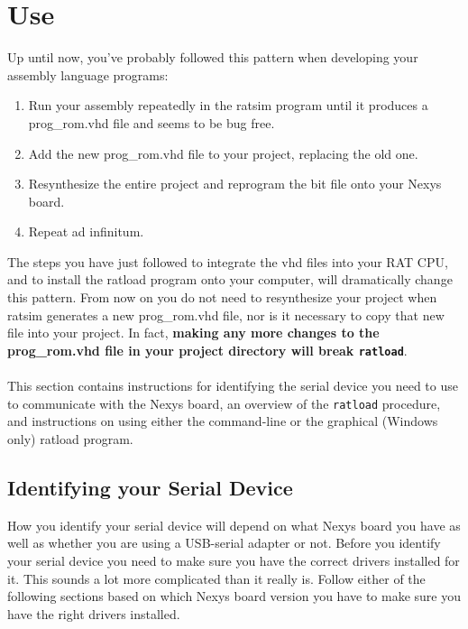\documentclass[notitlepage]{article}
\begin{document}
\section{Use}
Up until now, you've probably followed this pattern when developing your assembly language programs:
\begin{enumerate}
\item Run your assembly repeatedly in the ratsim program until it produces a prog\_rom.vhd file and seems to be bug free.
\item Add the new prog\_rom.vhd file to your project, replacing the old one.
\item Resynthesize the entire project and reprogram the bit file onto your Nexys board.
\item Repeat ad infinitum.
\end{enumerate}
The steps you have just followed to integrate the vhd files into your RAT CPU, and to install the ratload program onto your computer, will dramatically change this pattern. From now on you do not need to resynthesize your project when ratsim generates a new prog\_rom.vhd file, nor is it necessary to copy that new file into your project. In fact, \textbf{making any more changes to the prog\_rom.vhd file in your project directory will break \texttt{ratload}}.\\\\
This section contains instructions for identifying the serial device you need to use to communicate with the Nexys board, an overview of the \texttt{ratload} procedure, and instructions on using either the command-line or the graphical (Windows only) ratload program.

\subsection{Identifying your Serial Device}
\label{sec:serial_id}
How you identify your serial device will depend on what Nexys board you have as well as whether you are using a USB-serial adapter or not. Before you identify your serial device you need to make sure you have the correct drivers installed for it. This sounds a lot more complicated than it really is. Follow either of the following sections based on which Nexys board version you have to make sure you have the right drivers installed.
\end{document}

